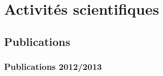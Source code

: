 \chapter{Activités scientifiques}

\newcommand{\rev}{avec \textit{peer review}}

\newcommand{\ifnotempty}[2]{\ifthenelse{\equal{#1}{}}{}{#2}}
\newcommand{\replace}[3]{\ifthenelse{\equal{#1}{#2}}{#3}{#1}}

\newcommand{\entree}[3]{\begin{samepage}\vspace{.3em}\begin{itemize}\item[$\bullet$]\textbf{#1}\quad#2\end{itemize}\vspace{.3em}%
#3\vspace{.7em}\end{samepage}}


\newcommand{\publi}[8]{\entree{#1}{#2}{%
\ifnotempty{#3}{#3. }%
\ifnotempty{#4}{#4\ifnotempty{#5#6#7}{, }}%
\ifnotempty{#6}{\replace{#5}{in}{in : }\textit{#6}\ifnotempty{#7}{, }}%
#7\ifnotempty{#4#5#6#7}{.}\ifnotempty{#3#4#5#6#7}{\ifnotempty{#8}{\\}}%
#8}}

\newcommand{\expose}[3]{\publi{#1}{}{#2}{}{}{}{#3}{}}



\section{Publications}\label{sec:publications}

\subsection{Publications 2012/2013}

